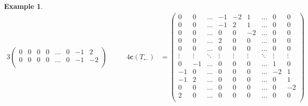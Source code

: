 \documentclass{amsart}
\theoremstyle{definition}
\newtheorem{example}[theorem]{Example}
\renewcommand{\b}[1]{{\boldsymbol{#1}}} %
\begin{document}
\begin{example}
\begin{table}
\begin{alignat*}{3}
\begin{pmatrix}
		0 & 0 & 0 & 0 & \dots & 0 & -1 & 2 \\
		0 & 0 & 0 & 0 & \dots & 0 & -1 & -2 \\
	\end{pmatrix}
	\qquad &
	4\b{c}(T_\leftarrow) & = \begin{pmatrix}
		0 & 0 & \dots & -1 & -2 & 1 & \dots & 0 & 0 \\
		0 & 0 & \dots & -1 & 2 & 1 & \dots & 0 & 0 \\
		0 & 0 & \dots & 0 & 0 & -2 & \dots & 0 & 0 \\
		0 & 0 & \dots & 2 & 0 & 0 & \dots & 0 & 0 \\
		0 & 0 & \dots & 0 & 0 & 0 & \dots & 0 & 0 \\
		\vdots & \vdots & \ddots & \vdots & \vdots & \vdots & \ddots & \vdots & \vdots \\
		0 & -1 & \dots & 0 & 0 & 0 & \dots & 1 & 0 \\
		-1 & 0 & \dots & 0 & 0 & 0 & \dots & -2 & 1 \\
		-1 & 2 & \dots & 0 & 0 & 0 & \dots & 0 & 1 \\
		0 & 0 & \dots & 0 & 0 & 0 & \dots & 0 & -2 \\
		2 & 0 & \dots & 0 & 0 & 0 & \dots & 0 & 0 \\
	\end{pmatrix}
	\\[.3cm]

\end{alignat*}
\end{table}
\end{example}
\end{document}
